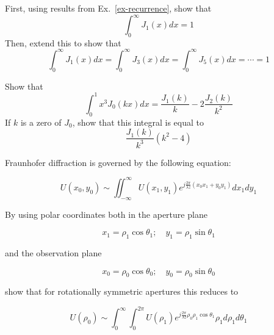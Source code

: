 \pagebreak

\begin{exer}
First, using results from Ex.~\ref{ex-recurrence}, show that
$$\int_0^\infty J_1( x) dx =  1$$
Then, extend this to show that
$$\int_0^\infty J_1( x) dx = \int_0^\infty J_3( x) dx = \int_0^\infty J_5( x) dx = \cdots = 1$$
\end{exer}

\begin{exer}
Show that
$$\int_0^1 x^3 J_0(k x) dx =  \frac{J_1(k)}{k} - 2 \frac{J_2(k)}{k^2}$$
If $k$ is a zero of $J_0$, show that this integral is equal to
$$\frac{J_1(k)}{k^3}\left(k^2-4\right)$$
\end{exer}

\begin{exer}
Fraunhofer diffraction is governed by the following equation:

$$U(x_0, y_0) \sim \iint_{-\infty}^{\infty} U(x_1, y_1) e ^{j \frac{2\pi}{\lambda z} (x_0 x_1 + y_0 y_1)} dx_1 dy_1  $$

By using polar coordinates both in the aperture plane

$$x_1 = \rho_1 \cos \theta_1; \quad y_1 = \rho_1 \sin \theta_1$$

and the observation plane

$$x_0 = \rho_0 \cos \theta_0; \quad y_0 = \rho_0 \sin \theta_0$$

show that for rotationally symmetric apertures this reduces to

$$U(\rho_0) \sim  \int_0^{\infty} \int_0^{2 \pi} U(\rho_1)  e ^{j \frac{2\pi}{\lambda z} \rho_0 \rho_1 \cos \theta_1} \rho_1 d\rho_1 d\theta_1  $$


\end{exer}
